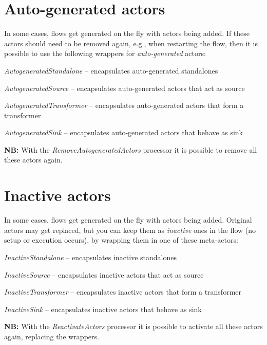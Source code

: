 \documentclass[a4paper]{book}
\begin{document}
\chapter{Auto-generated actors}
\label{autogeneratedactors}
In some cases, flows get generated on the fly with actors being added. If these
actors should need to be removed again, e.g., when restarting the flow, then
it is possible to use the following wrappers for \textit{auto-generated} actors:
\begin{tight_itemize}
	\item \textit{AutogeneratedStandalone} -- encapsulates auto-generated standalones
	\item \textit{AutogeneratedSource} -- encapsulates auto-generated actors that act as source
	\item \textit{AutogeneratedTransformer} -- encapsulates auto-generated actors that form a transformer
	\item \textit{AutogeneratedSink} -- encapsulates auto-generated actors that behave as sink
\end{tight_itemize}
\textbf{NB:} With the \textit{RemoveAutogeneratedActors} processor it is possible
to remove all these actors again.

\newpage
\chapter{Inactive actors}
\label{inactiveactors}
In some cases, flows get generated on the fly with actors being added. Original
actors may get replaced, but you can keep them as \textit{inactive} ones in the
flow (no setup or execution occurs), by wrapping them in one of these meta-actors:
\begin{tight_itemize}
	\item \textit{InactiveStandalone} -- encapsulates inactive standalones
	\item \textit{InactiveSource} -- encapsulates inactive actors that act as source
	\item \textit{InactiveTransformer} -- encapsulates inactive actors that form a transformer
	\item \textit{InactiveSink} -- encapsulates inactive actors that behave as sink
\end{tight_itemize}
\textbf{NB:} With the \textit{ReactivateActors} processor it is possible
to activate all these actors again, replacing the wrappers.

\newpage
\end{document}
